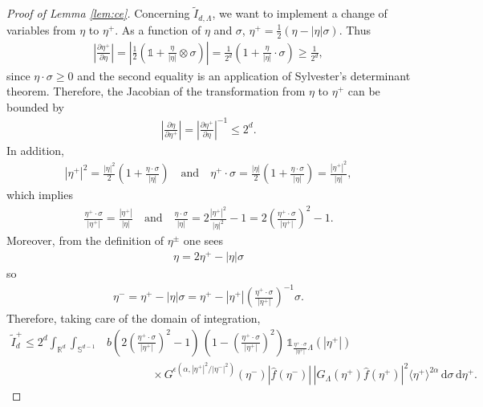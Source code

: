 \documentclass[11pt,a4paper,reqno]{amsart}
\theoremstyle{plain}
\theoremstyle{definition}
\begin{document}
\begin{proof}[Proof of Lemma \ref{lem:ce}]
Concerning $\widetilde{I}_{d,\Lambda}$, we want to implement a change of variables from $\eta$ to $\eta^+$.
As a function of $\eta$ and $\sigma$, $\eta^+= \frac{1}{2}(\eta-|\eta|\sigma)$. Thus
\begin{align*}
	\left| \frac{\partial\eta^+}{\partial\eta} \right| = \left| \frac{1}{2} \left({\mathds{1}} + \frac{\eta}{|\eta|}\otimes \sigma \right) \right| = \frac{1}{2^d} \left(1+ \frac{\eta}{|\eta|}\cdot\sigma\right) \geq \frac{1}{2^d},
\end{align*}
since $\eta\cdot \sigma \geq 0$ and the second equality is an application of Sylvester's determinant theorem. Therefore, the Jacobian of the transformation  from $\eta$ to $\eta^+$ can be bounded by
\begin{align*}
	\left| \frac{\partial\eta}{\partial\eta^+} \right|
	 = \left| \frac{\partial\eta^+}{\partial\eta} \right|^{-1} \le 2^d.
\end{align*}
In addition,
\begin{align*}
	|\eta^+|^2 = \frac{|\eta|^2}{2}\left(1+\frac{\eta\cdot\sigma}{|\eta|}\right) \quad \text{and} \quad \eta^+\cdot\sigma = \frac{|\eta|}{2} \left(1+\frac{\eta\cdot\sigma}{|\eta|}\right) = \frac{|\eta^+|^2}{|\eta|},
\end{align*}
 which implies
\begin{align*}
 	\frac{\eta^+\cdot\sigma}{|\eta^+|} = \frac{|\eta^+|}{|\eta|} \quad \text{and} \quad \frac{\eta\cdot\sigma}{|\eta|} = 2\frac{|\eta^+|^2}{|\eta|^2} - 1 = 2 \left(\frac{\eta^+\cdot\sigma}{|\eta^+|}\right)^2 - 1.
\end{align*}
Moreover, from the definition of $\eta^\pm$ one sees
\begin{align*}
	\eta= 2\eta^+ -|\eta|\sigma
\end{align*}
so
\begin{align*}
	\eta^- = \eta^+- |\eta|\sigma = \eta^+ - |\eta^+| \left(\frac{\eta^+\cdot\sigma}{|\eta^+|}\right)^{-1}\sigma .
\end{align*}
Therefore, taking care of the domain of integration,
\begin{align*}
	\widetilde{I}_d^+ \leq 2^{d} \int_{{\mathbb{R}}^d} \int_{{\mathbb{S}}^{d-1}} &b\left( 2 \left(\frac{\eta^+\cdot\sigma}{|\eta^+|}\right)^2 - 1\right)  \, \left(1-\left(\frac{\eta^+\cdot\sigma}{|\eta^+|}\right)^2 \right) \, {\mathds{1}}_{\frac{\eta^+\cdot\sigma}{|\eta^+|}\Lambda}(|\eta^+|)\\
	&\qquad \qquad \times G^{\epsilon\left(\alpha, |\eta^+|^2/|\eta^-|^2\right)}(\eta^-) |\hat{f}(\eta^-)|\, |G_{\Lambda}(\eta^+) \hat{f}(\eta^+)|^2 \langle\eta^+\rangle^{2\alpha}  \, \mathrm{d}\sigma\,\mathrm{d}\eta^+.

\end{align*}
\end{proof}
\end{document}
